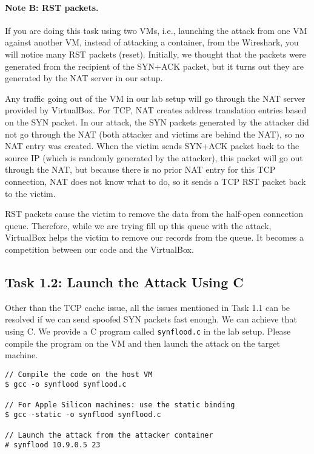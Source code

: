 \paragraph{Note B: RST packets.} 
If you are doing this task using two VMs, i.e., launching the attack from one VM
against another VM, instead of attacking a container, from the Wireshark,
you will notice many RST packets (reset). Initially, we thought that 
the packets were generated from the recipient of the SYN+ACK packet, 
but it turns out they are generated by the 
NAT server in our setup. 

Any traffic going out of the VM in our lab setup will go through the NAT server
provided by VirtualBox. For TCP, NAT creates address translation 
entries based on the SYN packet. 
In our attack, the SYN packets generated 
by the attacker did not go through the NAT (both attacker and victims are behind the 
NAT), so no NAT entry was created. When the victim sends SYN+ACK packet back to the
source IP (which is randomly generated by the attacker), this packet will 
go out through the NAT, but because there is no prior NAT entry
for this TCP connection, NAT does not know what to do,
so it sends a TCP RST packet back to the victim. 

RST packets cause the victim to remove the data from the half-open connection
queue. Therefore, while we are trying fill up this queue with the attack, 
VirtualBox helps the victim to remove our records from the queue. 
It becomes a competition between our code and the VirtualBox. 


\subsection{Task 1.2: Launch the Attack Using C} 

Other than the TCP cache issue, all the issues mentioned in Task 1.1 
can be resolved if we can send spoofed SYN packets fast enough. We
can achieve that using C. We provide a C program called \texttt{synflood.c}
in the lab setup. Please compile
the program on the VM and then launch the attack on the target machine.

\begin{lstlisting}
// Compile the code on the host VM
$ gcc -o synflood synflood.c

// For Apple Silicon machines: use the static binding
$ gcc -static -o synflood synflood.c

// Launch the attack from the attacker container
# synflood 10.9.0.5 23
\end{lstlisting}



